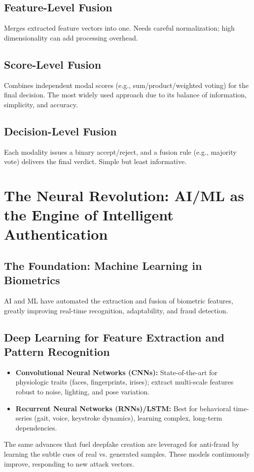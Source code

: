 \subsection{Feature-Level Fusion}
Merges extracted feature vectors into one. Needs careful normalization; high dimensionality can add processing overhead.

\subsection{Score-Level Fusion}
Combines independent modal scores (e.g., sum/product/weighted voting) for the final decision. The most widely used approach due to its balance of information, simplicity, and accuracy.

\subsection{Decision-Level Fusion}
Each modality issues a binary accept/reject, and a fusion rule (e.g., majority vote) delivers the final verdict. Simple but least informative.

\section{The Neural Revolution: AI/ML as the Engine of Intelligent Authentication}

\subsection{The Foundation: Machine Learning in Biometrics}
AI and ML have automated the extraction and fusion of biometric features, greatly improving real-time recognition, adaptability, and fraud detection.

\subsection{Deep Learning for Feature Extraction and Pattern Recognition}
\begin{itemize}
    \item \textbf{Convolutional Neural Networks (CNNs):} State-of-the-art for physiologic traits (faces, fingerprints, irises); extract multi-scale features robust to noise, lighting, and pose variation.
    \item \textbf{Recurrent Neural Networks (RNNs)/LSTM:} Best for behavioral time-series (gait, voice, keystroke dynamics), learning complex, long-term dependencies.
\end{itemize}
The same advances that fuel deepfake creation are leveraged for anti-fraud by learning the subtle cues of real vs. generated samples. These models continuously improve, responding to new attack vectors.

